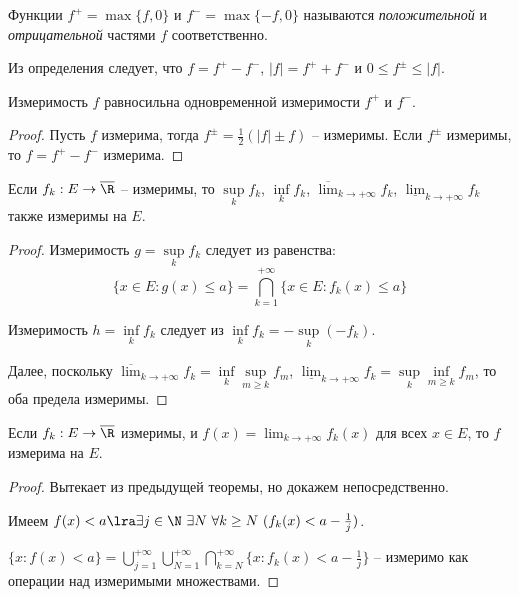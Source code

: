 
\begin{definition}
    Функции $f^{+} = \max\{f, 0\}$ и $f^{-} = \max\{-f, 0\}$ называются \textit{положительной} и \textit{отрицательной} частями $f$ соответственно.
\end{definition}

\begin{note}
    Из определения следует, что $f = f^{+} - f^{-}$, $|f| = f^{+} + f^{-}$ и $0 \leq f^{\pm} \leq |f|$.
\end{note}

\begin{corollary}
    Измеримость $f$ равносильна одновременной измеримости $f^{+}$ и $f^{-}$.
\end{corollary}

\begin{proof}
    Пусть $f$ измерима, тогда $f^{\pm} = \frac{1}{2}(|f| \pm f)$ -- измеримы. Если $f^{\pm}$ измеримы, то $f = f^{+} - f^{-}$ измерима.
\end{proof}

\begin{theorem}
    Если $f_{k}: E \to \overline{\R}$ -- измеримы, то $\underset{k}{\sup}f_{k}$, $\underset{k}{\inf}f_{k}$, $\overline{\lim}_{k \to +\infty}f_{k}$, $\underline{\lim}_{k \to +\infty}f_{k}$ также измеримы на $E$.
\end{theorem}

\begin{proof}
    Измеримость $g = \underset{k}{\sup}f_{k}$ следует из равенства:
    \[\{x \in E: g(x) \leq a\} = \bigcap_{k = 1}^{+\infty}\{x \in E: f_{k}(x) \leq a\}\]

    Измеримость $h = \underset{k}{\inf}f_{k}$ следует из $\underset{k}{\inf}f_{k} = -\underset{k}{\sup}(-f_{k})$.

    Далее, поскольку $\overline{\lim}_{k \to +\infty}f_{k} = \underset{k}{\inf}\underset{m \geq k}{\sup}f_{m}$, $\underline{\lim}_{k \to +\infty}f_{k} = \underset{k}{\sup}\underset{m \geq k}{\inf}f_{m}$, то оба предела измеримы.
\end{proof}

\begin{corollary}
    Если $f_{k}: E \to \overline{\R}$ измеримы, и $f(x) = \lim_{k \to +\infty}f_{k}(x)$ для всех $x \in E$, то $f$ измерима на $E$.
\end{corollary}

\begin{proof}
    Вытекает из предыдущей теоремы, но докажем непосредственно.

    Имеем $f(x) < a \lra \exists j \in \N \ \exists N \ \forall k \geq N \ (f_{k}(x) < a - \frac{1}{j})$.

    $\{x: f(x) < a\} = \bigcup_{j = 1}^{+\infty}\bigcup_{N = 1}^{+\infty}\bigcap_{k = N}^{+\infty} \{x: f_{k}(x) < a - \frac{1}{j}\}$ -- измеримо как операции над измеримыми множествами.
\end{proof}

